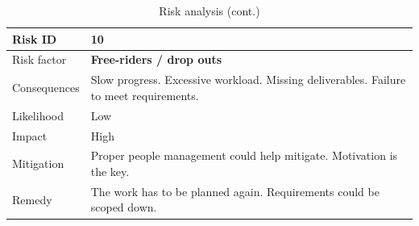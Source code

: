 \begin{table}[h]
\begin{tabular}{ | l | p{11.5cm} | }
  
  Risk ID & \textbf{10} \\
  \hline\noalign{\smallskip}\hline
  Risk factor   & \textbf{Free-riders / drop outs} \\
  Consequences  & Slow progress. Excessive workload. Missing deliverables. Failure to meet requirements. \\
  Likelihood    & Low \\
  Impact        & High \\
  Mitigation    & Proper people management could help mitigate. \newline
                  Motivation is the key. \\
  Remedy        & The work has to be planned again. \newline
                  Requirements could be scoped down. \\
  \hline

\end{tabular}
\caption{Risk analysis (cont.)}
\end{table}



